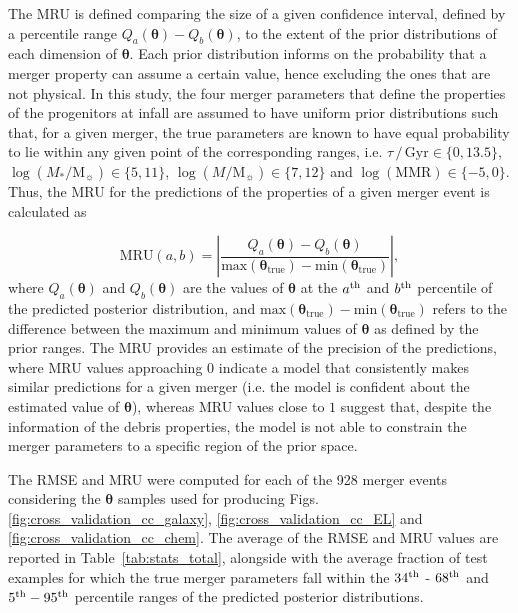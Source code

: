 The MRU is defined comparing the size of a given confidence interval, defined by a percentile range $Q_{a}(\bm{\theta}) -  Q_{b}(\bm{\theta})$, to the extent of the prior distributions of each dimension of $\bm{\theta}$. Each prior distribution informs on the probability that a merger property can assume a certain value, hence excluding the ones that are not physical. In this study, the four merger parameters that define the properties of the progenitors at infall are assumed to have uniform prior distributions such that, for a given merger, the true parameters are known to have equal probability to lie within any given point of the corresponding ranges, i.e. $\tau \,/\,\mathrm{Gyr} \in \{0,13.5\}$, $\log (M_{*}/\mathrm{M}_{\sun}) \in \{5,11\}$, $\log (M/\mathrm{M}_{\sun}) \in \{7,12\}$ and $\log (\mathrm{MMR}) \in \{-5,0\}$. Thus, the MRU for the predictions of the properties of a given merger event is calculated as 

\begin{equation}
    \text{MRU}(a,b) = \left| \frac{Q_{a}(\bm{\theta}) -  Q_{b}(\bm{\theta})}{\mathrm{max}(\bm{\theta_\mathrm{true}})-\mathrm{min}(\bm{\theta_\mathrm{true}})} \right |,
\end{equation}
where $Q_a(\bm{\theta})$ and $Q_b(\bm{\theta})$ are the values of $\bm{\theta}$ at the $a^{\rm th}$ and $b^{\rm th}$  percentile of the predicted posterior distribution, and $\mathrm{max}(\bm{\theta_\mathrm{true}})-\mathrm{min}(\bm{\theta_\mathrm{true}})$ refers to the difference between the maximum and minimum values of $\bm{\theta}$ as defined by the prior ranges. The MRU provides an estimate of the precision of  the predictions, where MRU values approaching $0$ indicate a model that consistently makes similar predictions for a given merger (i.e. the model is confident about the estimated value of $\bm{\theta}$), whereas MRU values close to $1$ suggest that, despite the information of the debris properties, the model is not able to constrain the merger parameters to a specific region of the prior space.  

The RMSE and MRU were computed for each of the 928 merger events considering the $\bm{\theta}$ samples used for producing Figs. \ref{fig:cross_validation_cc_galaxy}, \ref{fig:cross_validation_cc_EL} and \ref{fig:cross_validation_cc_chem}. The average of the RMSE and MRU values are reported in Table~\ref{tab:stats_total}, alongside with the average fraction of test examples for which the true merger parameters fall within the $34^{\rm th}$ - $68^{\rm th}$ and $5^{\rm th}- 95^{\rm th}$ percentile ranges of the predicted posterior distributions.

